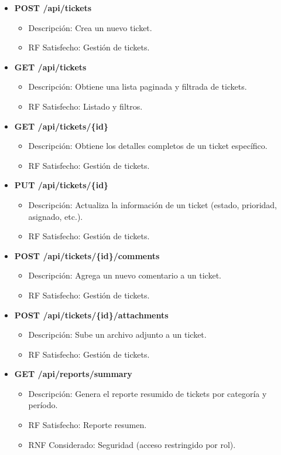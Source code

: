 \documentclass[12pt,a4paper]{article}
\begin{document}
\begin{itemize}
    \item \textbf{POST /api/tickets}
    \begin{itemize}
        \item Descripción: Crea un nuevo ticket.
        \item RF Satisfecho: Gestión de tickets.
    \end{itemize}
    
    \item \textbf{GET /api/tickets}
    \begin{itemize}
        \item Descripción: Obtiene una lista paginada y filtrada de tickets.
        \item RF Satisfecho: Listado y filtros.
    \end{itemize}
    
    \item \textbf{GET /api/tickets/\{id\}}
    \begin{itemize}
        \item Descripción: Obtiene los detalles completos de un ticket específico.
        \item RF Satisfecho: Gestión de tickets.
    \end{itemize}
    
    \item \textbf{PUT /api/tickets/\{id\}}
    \begin{itemize}
        \item Descripción: Actualiza la información de un ticket (estado, prioridad, asignado, etc.).
        \item RF Satisfecho: Gestión de tickets.
    \end{itemize}
    
    \item \textbf{POST /api/tickets/\{id\}/comments}
    \begin{itemize}
        \item Descripción: Agrega un nuevo comentario a un ticket.
        \item RF Satisfecho: Gestión de tickets.
    \end{itemize}
    
    \item \textbf{POST /api/tickets/\{id\}/attachments}
    \begin{itemize}
        \item Descripción: Sube un archivo adjunto a un ticket.
        \item RF Satisfecho: Gestión de tickets.
    \end{itemize}
    
    \item \textbf{GET /api/reports/summary}
    \begin{itemize}
        \item Descripción: Genera el reporte resumido de tickets por categoría y período.
        \item RF Satisfecho: Reporte resumen.
        \item RNF Considerado: Seguridad (acceso restringido por rol).
    \end{itemize}
\end{itemize}
\end{document}
